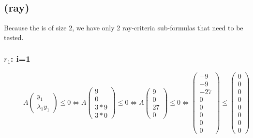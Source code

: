 	\newsavebox{\raycrit}%
	\subsection[Verifying: ray-criterion]{(ray) \usebox{\raycrit}}
	Because the \gna is of size $2$, we have only 2 ray-criteria sub-formulas that need to be tested.
	\subsubsection{$r_1$: i=1}
	\begin{figure}[H]
		\centering
		$A\begin{pmatrix} y_1 \\ \lambda_1y_1 \end{pmatrix} \le 0 \Leftrightarrow A\begin{pmatrix} 9 \\ 0 \\ 3*9 \\ 3*0 \end{pmatrix} \le 0 \Leftrightarrow A\begin{pmatrix} 9 \\ 0 \\ 27 \\ 0 \end{pmatrix} \le 0 \Leftrightarrow \begin{pmatrix} -9 \\ -9 \\ -27 \\ 0 \\ 0 \\ 0 \\ 0 \\ 0 \end{pmatrix} \le \begin{pmatrix} 0 \\ 0 \\ 0 \\ 0 \\ 0 \\ 0 \\ 0 \\ 0 \end{pmatrix}$
	\end{figure}
	
